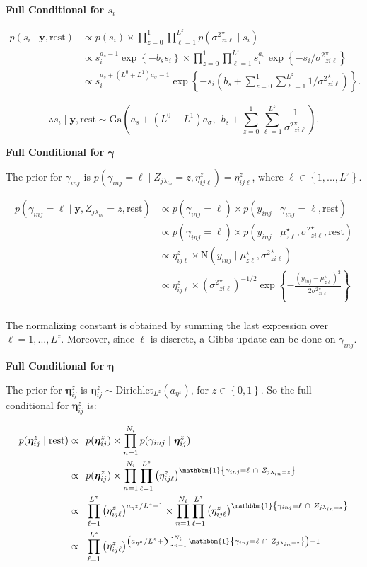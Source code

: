 \documentclass[12pt,]{article}
\newcommand{\p}[1]{\left(#1\right)}
\newcommand{\bc}[1]{ \left\{#1\right\} }
\newcommand{\N}{ \mathcal{N} }
\def\N{\text{N}}
\def\G{\text{Ga}}
\def\Dir{\text{Dirichlet}}
\def\lin{\lambda_{in}}
\def\y{\bm{y}}
\def\mus{\mu^\star}
\def\sss{{\sigma^2}^\star}
\newcommand{\Ind}[1]{\mathbbm{1}\bc{#1}}
\def\rest{\text{rest}}
\begin{document}
\textbf{Full Conditional for $s_i$}

\begin{align*}
p(s_i \mid \y, \rest) &\propto p(s_i) \times \prod_{z=0}^1 \prod_{\ell=1}^{L^z} p(\sss_{zi\ell} \mid s_i)\\
&\propto s_i^{a_s-1} \exp\bc{-b_s s_i} \times \prod_{z=0}^1  \prod_{\ell=1}^{L^z} s_i^{a_\sigma} \exp\bc{-s_i / \sss_{zi\ell}} \\
&\propto s_i^{a_s + (L^0 + L^1)a_\sigma - 1} \exp\bc{-s_i \p{b_s + \sum_{z=0}^1 \sum_{\ell=1}^{L^z} 1 / \sss_{zi\ell}}}.
\end{align*}

\[
\therefore s_i \mid \y, \rest \sim 
\G\p{a_s + (L^0 + L^1)a_\sigma, ~~ b_s + \sum_{z=0}^1 \sum_{\ell=1}^{L^z} \frac{1}{\sss_{zi\ell}} }.
\]
\vspace{2em}


\textbf{Full Conditional for $\bm\gamma$}

The prior for \(\gamma_{inj}\) is
\(p(\gamma_{inj} = \ell \mid Z_{j\lin}=z, \eta^z_{ij\ell}) = \eta^z_{ij\ell}\),
where \(\ell \in \bc{1,...,L^z}\).

\begin{align*}
p(\gamma_{inj}=\ell \mid \y, Z_{j\lin}=z, \rest) &\propto p(\gamma_{inj}=\ell) \times p(y_{inj} \mid \gamma_{inj}=\ell, \rest) \\
&\propto p(\gamma_{inj}=\ell) \times p(y_{inj} \mid \mus_{z\ell}, \sss_{zi\ell}, \rest) \\
%
&\propto \eta^z_{ij\ell} \times \N(y_{inj} \mid \mus_{z\ell}, \sss_{zi\ell}) \\
&\propto \eta^z_{ij\ell} \times (\sss_{zi\ell})^{-1/2}
\exp\bc{-\frac{(y_{inj} - \mus_{z\ell})^2}{2\sss_{zi\ell}}} \\
\end{align*}

The normalizing constant is obtained by summing the last expression over
\(\ell = 1,...,L^z\). Moreover, since \(\ell\) is discrete, a Gibbs
update can be done on \(\gamma_{inj}\).
\vspace{2em}


\textbf{Full Conditional for $\bm\eta$}

The prior for \(\bm\eta^z_{ij}\) is
\(\bm \eta^z_{ij} \sim \Dir_{L^z}(a_{\eta^z})\), for \(z\in\bc{0,1}\).
So the full conditional for \(\bm\eta^z_{ij}\) is:

\begin{align*}
p(\bm \eta^z_{ij} \mid \rest) \propto&~~ p(\bm{\eta}^z_{ij}) \times \prod_{n=1}^{N_i} p(\gamma_{inj} \mid \bm \eta^z_{ij})\\
\propto&~~ p(\bm \eta^z_{ij}) \times \prod_{n=1}^{N_i}\prod_{\ell=1}^{L^z} \p{\eta^z_{ij\ell}}^{\Ind{ \gamma_{inj}=\ell ~\cap~ Z_{j\lin=z}}}\\
%
\propto&~~ \prod_{\ell=1}^{L^z} \p{\eta^z_{ij\ell}}^{a_{\eta^z}/L^z-1} \times 
\prod_{n=1}^{N_i}\prod_{\ell=1}^{L^z} \p{\eta^z_{ij\ell}}^{\Ind{ \gamma_{inj}=\ell ~\cap~ Z_{j\lin=z}}}\\
\propto&~~ \prod_{\ell=1}^{L^z} \p{\eta^z_{ij\ell}}^{\p{a_{\eta^z} / L^z + \sum_{n=1}^{N_i} \Ind{ \gamma_{inj}=\ell ~\cap~ Z_{j\lin=z}}} - 1}\\
%
\end{align*}
\end{document}

